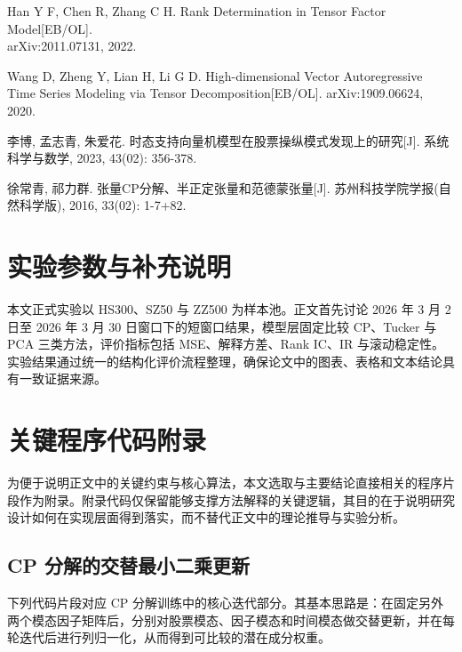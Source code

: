 \begin{enumerate}[label={[\arabic*]}]
  \item Han Y F, Chen R, Zhang C H. Rank Determination in Tensor Factor Model[EB/OL].\\
  arXiv:2011.07131, 2022.
  \item Wang D, Zheng Y, Lian H, Li G D. High-dimensional Vector Autoregressive Time Series Modeling via Tensor Decomposition[EB/OL]. arXiv:1909.06624, 2020.
  \item 李博, 孟志青, 朱爱花. 时态支持向量机模型在股票操纵模式发现上的研究[J]. 系统科学与数学, 2023, 43(02): 356-378.
  \item 徐常青, 祁力群. 张量CP分解、半正定张量和范德蒙张量[J]. 苏州科技学院学报(自然科学版), 2016, 33(02): 1-7+82.
\end{enumerate}
\fussy

\appendix
\chapter{实验参数与补充说明}

本文正式实验以 HS300、SZ50 与 ZZ500 为样本池。正文首先讨论 2026 年 3 月 2 日至 2026 年 3 月 30 日窗口下的短窗口结果，模型层固定比较 CP、Tucker 与 PCA 三类方法，评价指标包括 MSE、解释方差、Rank IC、IR 与滚动稳定性。实验结果通过统一的结构化评价流程整理，确保论文中的图表、表格和文本结论具有一致证据来源。

\chapter{关键程序代码附录}

为便于说明正文中的关键约束与核心算法，本文选取与主要结论直接相关的程序片段作为附录。附录代码仅保留能够支撑方法解释的关键逻辑，其目的在于说明研究设计如何在实现层面得到落实，而不替代正文中的理论推导与实验分析。

\section{CP 分解的交替最小二乘更新}

下列代码片段对应 CP 分解训练中的核心迭代部分。其基本思路是：在固定另外两个模态因子矩阵后，分别对股票模态、因子模态和时间模态做交替更新，并在每轮迭代后进行列归一化，从而得到可比较的潜在成分权重。

